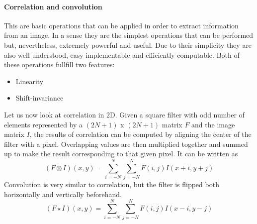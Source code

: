 \paragraph{Correlation and convolution}\cite{correlation-convolution}
This are basic operations that can be applied in order to extract information from an image. In a sense they are the simplest operations that can be performed but, nevertheless, extremely powerful and useful. Due to their simplicity they are also well understood, easy implementable and efficiently computable. Both of these operations fullfill two features:
\begin{itemize}
	\item Linearity
	\item Shift-invariance
\end{itemize}
Let us now look at correlation in 2D. Given a square filter with odd number of elements represented by a $(2N + 1)$ x $(2N + 1)$ matrix $F$ and the image matrix $I$, the results of correlation can be computed by aligning the center of the filter with a pixel. Overlapping values are then multiplied together and summed up to make the result corresponding to that given pixel. It can be written as
\begin{equation}
	(F \otimes I)(x, y) = \sum_{i = -N}^{N}\sum_{j = -N}^{N}F(i, j)I(x + i, y + j)
\end{equation}
Convolution is very similar to correlation, but the filter is flipped both horizontally and vertically beforehand. 
\begin{equation}
	(F \star I)(x, y) = \sum_{i = -N}^{N}\sum_{j = -N}^{N}F(i, j)I(x - i, y - j)
\end{equation}

